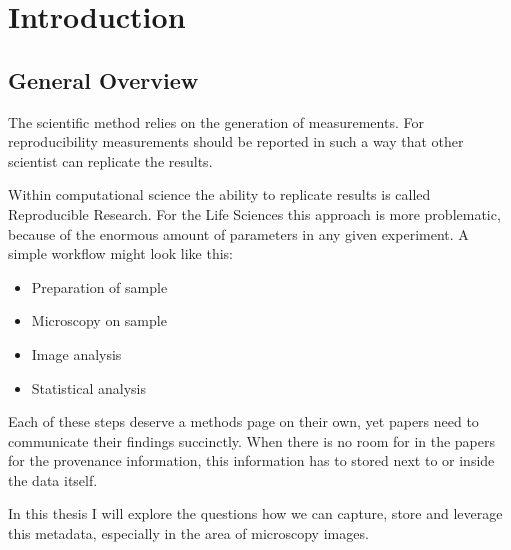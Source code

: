 
\chapter{Introduction} %

\label{Chapter1}



\section{General Overview}

The scientific method  relies on the
generation of measurements. For reproducibility
 measurements should be reported in such a way
that other scientist can replicate the results.

Within computational science the ability to replicate results is
called Reproducible Research\cite{FomelReproducibleResearch}. For the Life
Sciences this approach is more problematic,
because of the enormous amount of parameters in any given
experiment. A simple workflow might look like this:

\begin{itemize}
\item Preparation of sample
\item Microscopy on sample
\item Image analysis
\item Statistical analysis
\end{itemize}

Each of these steps deserve a methods page on their own, yet papers
need to communicate their findings succinctly. When there is no room
for in the papers for the provenance information,
this information has to stored next to or inside the data itself.

In this thesis I will explore the questions how we can capture, store
and leverage this metadata, especially in the area of
microscopy images.


